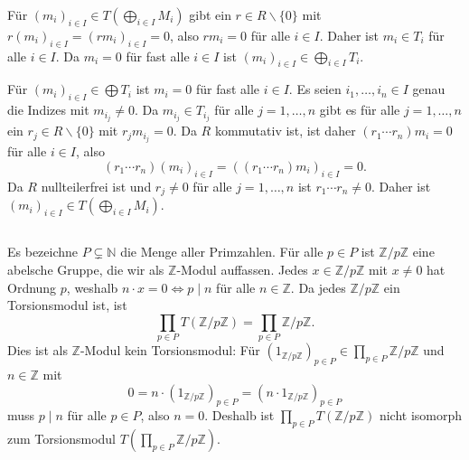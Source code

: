 \documentclass[a4paper,10pt]{article}
\theoremstyle{definition}
\newcommand{\N}{\mathbb{N}}
\newcommand{\Z}{\mathbb{Z}}
\begin{document}
Für $(m_i)_{i \in I} \in T\left( \bigoplus_{i \in I} M_i \right)$ gibt ein $r \in R \smallsetminus \{0\}$ mit $r(m_i)_{i \in I} = (rm_{i})_{i \in I} = 0$, also $rm_i = 0$ für alle $i \in I$. Daher ist $m_i \in T_i$ für alle $i \in I$. Da $m_i = 0$ für fast alle $i \in I$ ist $(m_i)_{i \in I} \in \bigoplus_{i \in I} T_i$.

Für $(m_i)_{i \in I} \in \bigoplus T_i$ ist $m_i = 0$ für fast alle $i \in I$. Es seien $i_1, \ldots, i_n \in I$ genau die Indizes mit $m_{i_j} \neq 0$. Da $m_{i_j} \in T_{i_j}$ für alle $j=1,\ldots,n$ gibt es für alle $j=1,\ldots,n$ ein $r_j \in R \smallsetminus \{0\}$ mit $r_j m_{i_j} = 0$. Da $R$ kommutativ ist, ist daher $(r_1 \cdots r_n) m_i = 0$ für alle $i \in I$, also
\[
 (r_1 \cdots r_n) (m_i)_{i \in I} = ((r_1 \cdots r_n) m_i)_{i \in I} = 0.
\]
Da $R$ nullteilerfrei ist und $r_j \neq 0$ für alle $j=1,\ldots,n$ ist $r_1 \cdots r_n \neq 0$. Daher ist $(m_i)_{i \in I} \in T(\bigoplus_{i \in I} M_i)$.


\subsection{}
Es bezeichne $P \subsetneq \N$ die Menge aller Primzahlen. Für alle $p \in P$ ist $\Z/p\Z$ eine abelsche Gruppe, die wir als $\Z$-Modul auffassen. Jedes $x \in \Z/p\Z$ mit $x \neq 0$ hat Ordnung $p$, weshalb $n \cdot x = 0 \Leftrightarrow p \mid n$ für alle $n \in \Z$. Da jedes $\Z/p\Z$ ein Torsionsmodul ist, ist
\[
 \prod_{p \in P} T(\Z/p\Z) = \prod_{p \in P} \Z/p\Z.
\]
Dies ist als $\Z$-Modul kein Torsionsmodul: Für $(1_{\Z/p\Z})_{p \in P} \in \prod_{p \in P} \Z/p\Z$ und $n \in \Z$ mit
\[
 0 = n \cdot (1_{\Z/p\Z})_{p \in P} = (n \cdot 1_{\Z/p\Z})_{p \in P}
\]
muss $p \mid n$ für alle $p \in P$, also $n = 0$. Deshalb ist $\prod_{p \in P} T(\Z/p\Z)$ nicht isomorph zum Torsionsmodul $T(\prod_{p \in P} \Z/p\Z)$.
\end{document}
